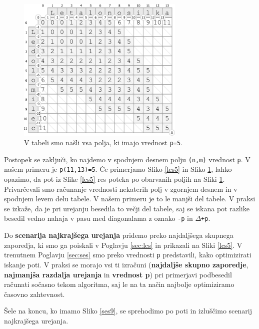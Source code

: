\documentclass[a4paper, 12pt, twoside]{book}
\begin{document}
\begin{figure}[placement h]
\begin{center}
\includegraphics[width=8cm]{img/ses8.pdf}
\end{center}
\caption{V tabeli smo našli vsa polja, ki imajo vrednost {\tt p=5}.}
\label{ses8}
\end{figure}

Postopek se zaključi, ko najdemo v spodnjem desnem polju {\tt (n,m)} vrednost {\tt p}. V našem primeru je {\tt p(11,13)=5}. Če primerjamo Sliko \ref{lcs5} in Sliko \ref{ses8}, lahko opazimo, da pot iz Slike \ref{lcs5} res poteka po obarvanih poljih na Sliki \ref{ses8}. Privarčevali smo računanje vrednosti nekaterih polj v zgornjem desnem in v spodnjem levem delu tabele. V našem primeru je to le manjši del tabele. V praksi se izkaže, da je pri urejanju besedila to večji del tabele, saj se iskana pot razlike besedil vedno nahaja v pasu med diagonalama z oznako {\tt -p} in {\tt $\Delta$+p}.

Do \textbf{scenarija najkrajšega urejanja} pridemo preko najdaljšega skupnega zaporedja, ki smo ga poiskali v Poglavju \ref{sec:lcs} in prikazali na Sliki \ref{lcs5}. V trenutnem Poglavju \ref{sec:ses} smo preko vrednosti {\tt p} predstavili, kako optimizirati iskanje poti. V praksi se morajo vsi ti izračuni (\textbf{najdaljše skupno zaporedje}, \textbf{najmanjša razdalja urejanja} in \textbf{vrednost p}) pri primerjavi podbesedil računati sočasno tekom algoritma, saj le na ta način najbolje optimiziramo časovno zahtevnost.

Šele na koncu, ko imamo Sliko \ref{ses9}, se sprehodimo po poti in izluščimo scenarij najkrajšega urejanja.

\pagebreak
\end{document}
